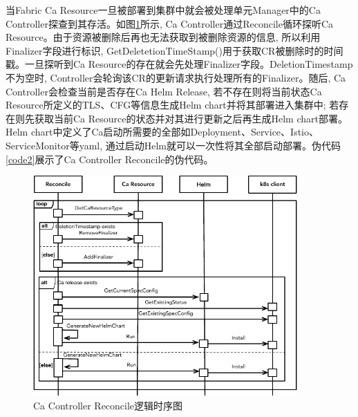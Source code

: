 当Fabric Ca Resource一旦被部署到集群中就会被处理单元Manager中的Ca  Controller探查到其存活。如图\ref{reconcile}所示, Ca Controller通过Reconcile循环探听Ca Resource。由于资源被删除后再也无法获取到被删除资源的信息, 所以利用Finalizer字段进行标识, GetDeletetionTimeStamp()用于获取CR被删除时的时间戳。一旦探听到Ca Resource的存在就会先处理Finalizer字段。DeletionTimestamp不为空时, Controller会轮询该CR的更新请求执行处理所有的Finalizer。随后, Ca Controller会检查当前是否存在Ca Helm Release, 若不存在则将当前状态Ca Resource所定义的TLS、CFG等信息生成Helm chart并将其部署进入集群中; 若存在则先获取当前Ca Resource的状态并对其进行更新之后再生成Helm chart部署。Helm chart中定义了Ca启动所需要的全部如Deployment、Service、Istio、ServiceMonitor等yaml, 通过启动Helm就可以一次性将其全部启动部署。伪代码\ref{code2}展示了Ca Controller Reconcile的伪代码。

\begin{figure}[!htbp] %
    \centering %
    \includegraphics[width=0.9\textwidth]{FIGs/chapter4/reconcile.pdf} %
    \caption{Ca Controller Reconcile逻辑时序图} %
    \label{reconcile} %
\end{figure}%

